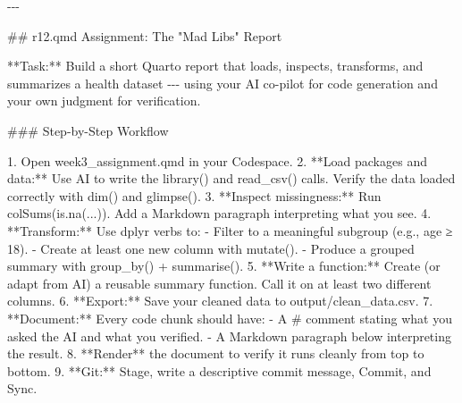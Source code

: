 \documentclass[
  letterpaper,
  DIV=11,
  numbers=noendperiod,
  oneside]{scrreprt}
\newenvironment{Shaded}{\begin{snugshade}}{\end{snugshade}}
\newcommand{\FunctionTok}[1]{\textcolor[rgb]{0.28,0.35,0.67}{#1}}
\newcommand{\InformationTok}[1]{\textcolor[rgb]{0.37,0.37,0.37}{#1}}
\newcommand{\NormalTok}[1]{\textcolor[rgb]{0.00,0.23,0.31}{#1}}
\newcommand{\SpecialStringTok}[1]{\textcolor[rgb]{0.13,0.47,0.30}{#1}}
\begin{document}
\begin{Shaded}
\begin{Highlighting}[numbers=left,,]
\NormalTok{{-}{-}{-}}

\FunctionTok{\#\# \textasciigrave{}r12.qmd\textasciigrave{} Assignment: The "Mad Libs" Report}

\NormalTok{**Task:** Build a short Quarto report that loads, inspects, transforms, and summarizes a health dataset {-}{-}{-} using your AI co{-}pilot for code generation and your own judgment for verification.}

\FunctionTok{\#\#\# Step{-}by{-}Step Workflow}

\SpecialStringTok{1. }\NormalTok{Open }\InformationTok{\textasciigrave{}week3\_assignment.qmd\textasciigrave{}}\NormalTok{ in your Codespace.}
\SpecialStringTok{2. }\NormalTok{**Load packages and data:** Use AI to write the }\InformationTok{\textasciigrave{}library()\textasciigrave{}}\NormalTok{ and }\InformationTok{\textasciigrave{}read\_csv()\textasciigrave{}}\NormalTok{ calls. Verify the data loaded correctly with }\InformationTok{\textasciigrave{}dim()\textasciigrave{}}\NormalTok{ and }\InformationTok{\textasciigrave{}glimpse()\textasciigrave{}}\NormalTok{.}
\SpecialStringTok{3. }\NormalTok{**Inspect missingness:** Run }\InformationTok{\textasciigrave{}colSums(is.na(...))\textasciigrave{}}\NormalTok{. Add a Markdown paragraph interpreting what you see.}
\SpecialStringTok{4. }\NormalTok{**Transform:** Use }\InformationTok{\textasciigrave{}dplyr\textasciigrave{}}\NormalTok{ verbs to:}
\SpecialStringTok{   {-} }\NormalTok{Filter to a meaningful subgroup (e.g., age ≥ 18).}
\SpecialStringTok{   {-} }\NormalTok{Create at least one new column with }\InformationTok{\textasciigrave{}mutate()\textasciigrave{}}\NormalTok{.}
\SpecialStringTok{   {-} }\NormalTok{Produce a grouped summary with }\InformationTok{\textasciigrave{}group\_by()\textasciigrave{}}\NormalTok{ + }\InformationTok{\textasciigrave{}summarise()\textasciigrave{}}\NormalTok{.}
\SpecialStringTok{5. }\NormalTok{**Write a function:** Create (or adapt from AI) a reusable summary function. Call it on at least two different columns.}
\SpecialStringTok{6. }\NormalTok{**Export:** Save your cleaned data to }\InformationTok{\textasciigrave{}output/clean\_data.csv\textasciigrave{}}\NormalTok{.}
\SpecialStringTok{7. }\NormalTok{**Document:** Every code chunk should have:}
\SpecialStringTok{   {-} }\NormalTok{A }\InformationTok{\textasciigrave{}\#\textasciigrave{}}\NormalTok{ comment stating what you asked the AI and what you verified.}
\SpecialStringTok{   {-} }\NormalTok{A Markdown paragraph below interpreting the result.}
\SpecialStringTok{8. }\NormalTok{**Render** the document to verify it runs cleanly from top to bottom.}
\SpecialStringTok{9. }\NormalTok{**Git:** Stage, write a descriptive commit message, Commit, and Sync.}


\end{Highlighting}
\end{Shaded}
\end{document}
